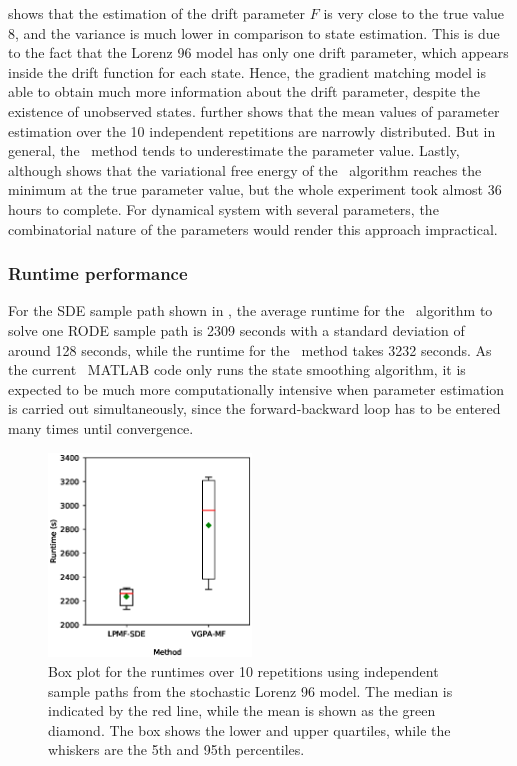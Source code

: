  shows that the estimation of the drift parameter $F$ is very close to the true value 8, and the variance is much lower in comparison to state estimation.
This is due to the fact that the Lorenz 96 model has only one drift parameter, which appears inside the drift function for each state.
Hence, the gradient matching model is able to obtain much more information about the drift parameter, despite the existence of unobserved states.
 further shows that the mean values of parameter estimation over the 10 independent repetitions are narrowly distributed.
But in general, the \algolpmfsde\ method tends to underestimate the parameter value.
Lastly, although  shows that the variational free energy of the \algovgpamf\ algorithm reaches the minimum at the true parameter value, but the whole experiment took almost 36 hours to complete.
For dynamical system with several parameters, the combinatorial nature of the parameters would render this approach impractical.

\subsubsection*{Runtime performance}

For the SDE sample path shown in , the average runtime for the \algolpmfsde\ algorithm to solve one RODE sample path is 2309 seconds with a standard deviation of around 128 seconds, while the runtime for the \algovgpamf\ method takes 3232 seconds.
As the current \algovgpamf\ MATLAB code only runs the state smoothing algorithm, it is expected to be much more computationally intensive when parameter estimation is carried out simultaneously, since the forward-backward loop has to be entered many times until convergence.

\begin{figure}
    \centering
    \includegraphics[width=0.48\textwidth]{graphics/lorenz-96-runtime-boxplot}
    \caption{Box plot for the runtimes over 10 repetitions using independent sample paths from the stochastic Lorenz 96 model. The median is indicated by the red line, while the mean is shown as the green diamond. The box shows the lower and upper quartiles, while the whiskers are the 5th and 95th percentiles.}        
    \label{fig-lorenz-96-runtime-boxplot}
\end{figure}


